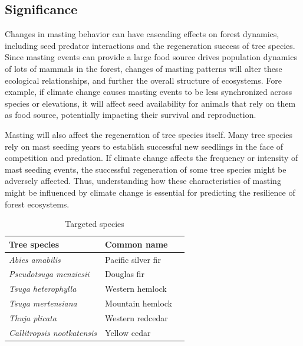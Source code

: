 \documentclass[11pt,letter]{article}
\begin{document}
\subsection{Significance}
Changes in masting behavior can have cascading effects on forest dynamics, including seed predator interactions and the regeneration success of tree species. Since masting events can provide a large food source drives population dynamics of lots of mammals in the forest, changes of masting patterns will alter these ecological relationships, and further the overall structure of ecosystems. Fore example, if climate change causes masting events to be less synchronized across species or elevations, it will affect seed availability for animals that rely on them as food source, potentially impacting their survival and reproduction.\par

Masting will also affect the regeneration of tree species itself. Many tree species rely on mast seeding years to establish successful new seedlings in the face of competition and predation. If climate change affects the frequency or intensity of mast seeding events, the successful regeneration of some tree species might be adversely affected. Thus, understanding how these characteristics of masting might be influenced by climate change is essential for predicting the resilience of forest ecosystems.



 
\begin{table}[htb]
	\centering
	\small
	\caption{Targeted species}
\begin{tabular}{|p{5cm}|p{5cm}|p{5cm}|}
\hline
 Tree species & Common name\\ \hline %
\textit{Abies amabilis} & Pacific silver fir \\ \hline
\textit{Pseudotsuga menziesii} & Douglas fir\\ \hline
\textit{Tsuga heterophylla} & Western hemlock\\ \hline
\textit{Tsuga mertensiana} & Mountain hemlock\\ \hline
\textit{Thuja plicata} & Western redcedar\\ \hline
\textit{Callitropsis nootkatensis} & Yellow cedar\\ \hline
\end{tabular}
\label{table:species}
\end{table}
\end{document}
